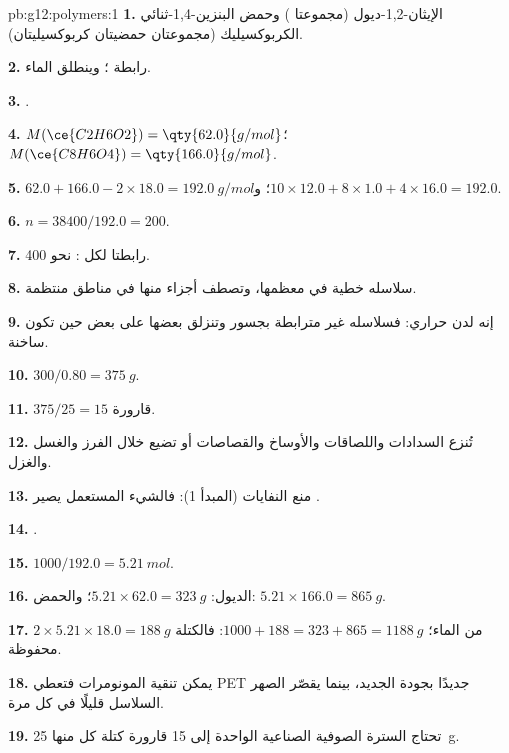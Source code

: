 \begin{solution}{pb:g12:polymers:1}
\textbf{1.} الإيثان-1,2-ديول (مجموعتا )
وحمض البنزين-1,4-ثنائي الكربوكسيليك (مجموعتان حمضيتان كربوكسيليتان).

\textbf{2.} رابطة ؛ وينطلق الماء.

\textbf{3.} .

\textbf{4.} $M(\ce{C2H6O2}) = \qty{62.0}{g/mol}$؛ $M(\ce{C8H6O4}) =
\qty{166.0}{g/mol}$.

\textbf{5.} $62.0 + 166.0 - 2 \times 18.0 = \qty{192.0}{g/mol}$؛
و$10 \times 12.0 + 8 \times 1.0 + 4 \times 16.0 = 192.0$.

\textbf{6.} $n = 38400/192.0 = 200$.

\textbf{7.} رابطتا  لكل : نحو 400.

\textbf{8.} سلاسله خطية في معظمها، وتصطف أجزاء منها في
مناطق منتظمة.

\textbf{9.} إنه لدن حراري: فسلاسله غير مترابطة بجسور
وتنزلق بعضها على بعض حين تكون ساخنة.

\textbf{10.} $300/0.80 = \qty{375}{g}$.

\textbf{11.} $375/25 = 15$ قارورة.

\textbf{12.} تُنزع السدادات واللصاقات والأوساخ والقصاصات أو تضيع خلال
الفرز والغسل والغزل.

\textbf{13.} منع النفايات (المبدأ 1): فالشيء المستعمل يصير .

\textbf{14.} .

\textbf{15.} $1000/192.0 = \qty{5.21}{mol}$.

\textbf{16.} الديول: $5.21 \times 62.0 = \qty{323}{g}$؛ والحمض:
$5.21 \times 166.0 = \qty{865}{g}$.

\textbf{17.} $2 \times 5.21 \times 18.0 = \qty{188}{g}$ من الماء؛
$1000 + 188 = 323 + 865 = \qty{1188}{g}$: فالكتلة محفوظة.

\textbf{18.} يمكن تنقية المونومرات فتعطي PET جديدًا بجودة
الجديد، بينما يقصّر الصهر السلاسل قليلًا في كل مرة.

\textbf{19.} تحتاج السترة الصوفية الصناعية الواحدة إلى 15 قارورة كتلة كل منها \qty{25}{g}.
\end{solution}
